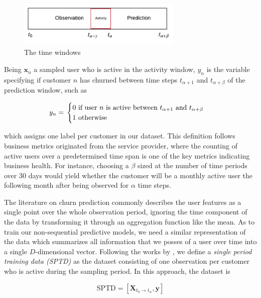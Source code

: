 \documentclass{kththesis}
\begin{document}
\begin{figure}[h]
    \centering
    \includegraphics[width=0.7\textwidth,keepaspectratio]{figures/timewindows.pdf}
    \caption{The time windows}
    \label{fig:timewindows}
\end{figure}

Being $\mathbf{x}_n$ a sampled user who is active in the activity window, $y_{n}$ is the variable specifying if customer $n$ has churned between time steps $t_{\alpha+1}$ and $t_{\alpha+\beta}$ of the prediction window, such as

\begin{equation}
y_n = \\ 
\begin{cases}
  \text{0 if user $n$ is active between $t_{\alpha+1}$ and $t_{\alpha+\beta}$} \\    
  \text{1 otherwise}    
\end{cases}
\end{equation}

which assigns one label per customer in our dataset. This definition follows business metrics originated from the service provider, where the counting of active users over a predetermined time span is one of the key metrics indicating business health. For instance, choosing a $\beta$ sized at the number of time periods over 30 days would yield whether the customer will be a monthly active user the following month after being observed for $\alpha$ time steps. 

The literature on churn prediction commonly describes the user features as a single point over the whole observation period, ignoring the time component of the data by transforming it through an aggregation function like the mean. As to train our non-sequential predictive models, we need a similar representation of the data which summarizes all information that we posses of a user over time into a single $D$-dimensional vector. Following the works by \citep{GurAli2014}, we define a \emph{single period training data (SPTD)} as the dataset consisting of one observation per customer who is active during the sampling period. In this approach, the dataset is 

\begin{equation}
\text{SPTD} = [\mathbf{X}_{t_0 \rightarrow t_\alpha}, \mathbf{y}]
\end{equation}
\end{document}
